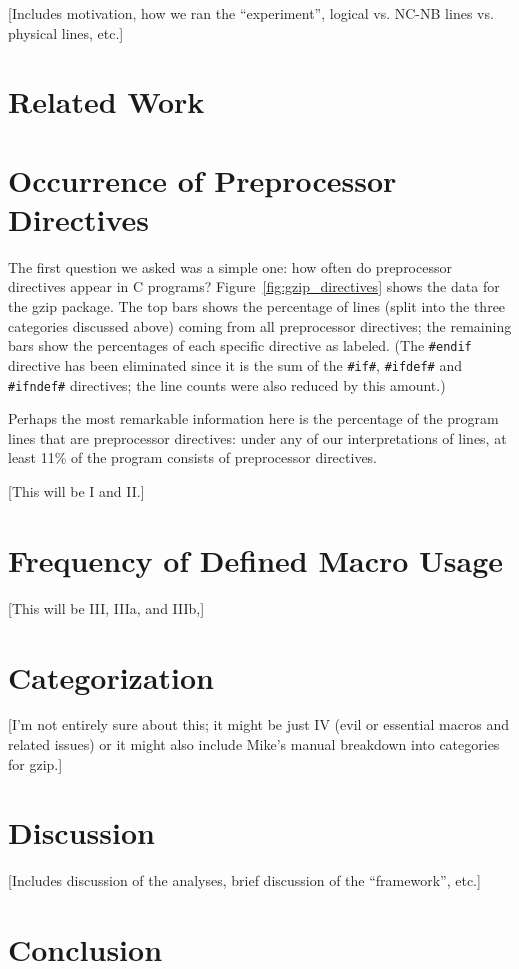 [Includes motivation, how we ran the ``experiment'', logical vs. NC-NB
lines vs. physical lines, etc.]

\section{Related Work}\label{sec:related}

\section{Occurrence of Preprocessor Directives}\label{sec:directives}

The first question we asked was a simple one: how often do
preprocessor directives appear in C programs?
Figure~\ref{fig:gzip_directives} shows the data for the gzip package.
The top bars shows the percentage of lines (split into the three
categories discussed above) coming from all preprocessor directives;
the remaining bars show the percentages of each specific directive as
labeled.  (The \verb+#endif+ directive has been eliminated since it is
the sum of the \verb+#if#+, \verb+#ifdef#+ and \verb+#ifndef#+ directives;
the line counts were also reduced by this amount.)

Perhaps the most remarkable information here is the percentage of the
program lines that are preprocessor directives: under any of our
interpretations of lines, at least 11\% of the program consists of
preprocessor directives.  


[This will be I and II.]

\section{Frequency of Defined Macro Usage}\label{sec:usage}

[This will be III, IIIa, and IIIb,]

\section{Categorization}\label{sec:categorization}

[I'm not entirely sure about this; it might be just IV (evil or
essential macros and related issues) or it might also include Mike's
manual breakdown into categories for gzip.]

\section{Discussion}\label{sec:discussion}

[Includes discussion of the analyses, brief discussion of the
``framework'', etc.]

\section{Conclusion}\label{sec:conclusion}

\small 




